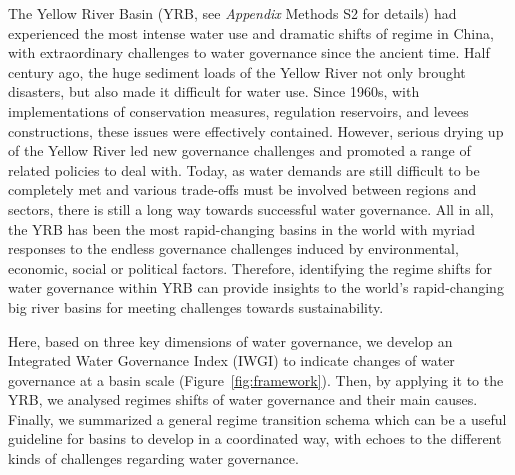 \documentclass[9pt, twocolumn, twoside, lineno]{pnas-new}
\begin{document}
\label{introduction-section-3}
The Yellow River Basin (YRB, see \textit{Appendix} Methods S2 for details) had experienced the most intense water use and dramatic shifts of regime in China, with extraordinary challenges to water governance since the ancient time.
Half century ago, the huge sediment loads of the Yellow River not only brought disasters, but also made it difficult for water use. 
Since 1960s, with implementations of conservation measures, regulation reservoirs, and levees constructions, these issues were effectively contained.
However, serious drying up of the Yellow River led new governance challenges and promoted a range of related policies to deal with.
Today, as water demands are still difficult to be completely met and various trade-offs must be involved between regions and sectors, there is still a long way towards successful water governance.
All in all, the YRB has been the most rapid-changing basins in the world with myriad responses to the endless governance challenges induced by environmental, economic, social or political factors.
Therefore, identifying the regime shifts for water governance within YRB can provide insights to the world's rapid-changing big river basins for meeting challenges towards sustainability.

\label{introduction-section-3}
Here, based on three key dimensions of water governance, we develop an Integrated Water Governance Index (IWGI) to indicate changes of water governance at a basin scale (Figure~\ref{fig:framework}).
Then, by applying it to the YRB, we analysed regimes shifts of water governance and their main causes.
Finally, we summarized a general regime transition schema which can be a useful guideline for basins to develop in a coordinated way, with echoes to the different kinds of challenges regarding water governance.
\end{document}
